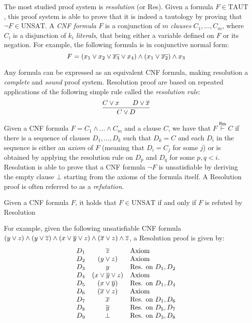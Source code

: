 The most studied proof system is \textit{resolution} (or \textsf{Res}). Given a formula $F \in \mathrm{TAUT}$, this proof system is able to prove that it is indeed a tautology by proving that $\lnot F \in \mathrm{UNSAT}$. A \textit{CNF formula} $F$ is a conjunction of $m$ \textit{clauses} $C_1, \ldots, C_m$, where $C_i$ is a disjunction of $k_i$ \textit{literals}, that being either a variable defined on $F$ or its negation. For example, the following formula is in conjunctive normal form:
\[F = (x_1 \lor x_2 \lor \overline{x_3} \lor x_4) \land (x_1 \lor \overline{x_2}) \land x_3\]

Any formula can be expressed as an equivalent CNF formula, making resolution a \textit{complete} and \textit{sound} proof system. Resolution proof are based on repeated applications of the following simple rule called the \textit{resolution rule}:
\[\dfrac{C \lor x \qquad D \lor \overline x}{C \lor D}\]

Given a CNF formula $F = C_1 \land \ldots \land C_m$ and a clause $C$, we have that $F \stackrel{\mathsf{Res}}{\vdash} C$ if there is a sequence of clauses $D_1, \ldots, D_k$ such that $D_k = C$ and each $D_i$ in the sequence is either an \textit{axiom} of $F$ (meaning that $D_i = C_j$ for some $j$) or is obtained by applying the resolution rule on $D_p$ and $D_q$ for some $p,q < i$. Resolution is able to prove that a CNF formula $\lnot F$ is unsatisfiable by deriving the empty clause $\bot$ starting from the axioms of the formula itself. A Resolution proof is often referred to as a \textit{refutation}.

\begin{proposition}
    Given a CNF formula $F$, it holds that $F \in \mathrm{UNSAT}$ if and only if $F$ is refuted by Resolution
\end{proposition}

For example, given the following unsatisfiable CNF formula $(y \lor z) \land (y \lor \overline{z}) \land (x \lor \overline{y} \lor z) \land (\overline{x} \lor z) \land \overline{z}$, a Resolution proof is given by:
\[\begin{array}{lcl}
    D_1 & \overline{z} & \text{Axiom} \\
    D_2 & (y \lor z) & \text{Axiom} \\
    D_3 & y & \text{Res. on $D_1, D_2$} \\
    D_4 & (x \lor \overline{y} \lor z)  & \text{Axiom} \\
    D_5 & (x \lor \overline{y}) & \text{Res. on $D_1, D_4$} \\
    D_6 & (\overline{x} \lor z) & \text{Axiom} \\
    D_7 & \overline{x} & \text{Res. on $D_1, D_6$} \\
    D_8 & \overline{y} & \text{Res. on $D_5, D_7$} \\
    D_9 & \bot & \text{Res. on $D_3, D_8$} \\
\end{array}\]

